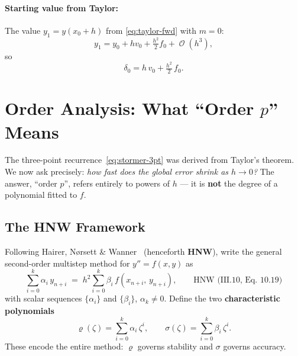 \documentclass[11pt]{article}
\DeclareMathOperator{\OO}{\mathcal{O}}
\begin{document}
\paragraph{Starting value from Taylor:}
The value $y_1 = y(x_0 + h)$ from \eqref{eq:taylor-fwd} with $m=0$:
\begin{equation}
  \label{eq:y1}
  y_1 = y_0 + h v_0 + \tfrac{h^2}{2} f_0 + \OO(h^3),
\end{equation}
so
\begin{equation}
  \label{eq:delta0}
  \boxed{\delta_0 = h\, v_0 + \tfrac{h^2}{2}\, f_0.}
\end{equation}

\section{Order Analysis: What ``Order $p$'' Means}
\label{sec:order}

The three-point recurrence~\eqref{eq:stormer-3pt} was derived from Taylor's
theorem.  We now ask precisely: \emph{how fast does the global error shrink as
$h \to 0$?}  The answer, ``order $p$'', refers entirely to powers of $h$ --- it
is \textbf{not} the degree of a polynomial fitted to $f$.

\subsection{The HNW Framework}

Following Hairer, N{\o}rsett \& Wanner~\cite{HNW} (henceforth \textbf{HNW}),
write the general second-order multistep method for $y'' = f(x,y)$ as
\begin{equation}
  \label{eq:general-multistep}
  \sum_{i=0}^{k} \alpha_i\, y_{n+i}
  \;=\; h^2 \sum_{i=0}^{k} \beta_i\, f(x_{n+i},\, y_{n+i}),
  \qquad \text{HNW (III.10, Eq.~10.19)}
\end{equation}
with scalar sequences $\{\alpha_i\}$ and $\{\beta_i\}$, $\alpha_k \neq 0$.
Define the two \textbf{characteristic polynomials}
\begin{equation}
  \label{eq:char-polys}
  \varrho(\zeta) = \sum_{i=0}^{k} \alpha_i\,\zeta^i,
  \qquad
  \sigma(\zeta) = \sum_{i=0}^{k} \beta_i\,\zeta^i.
\end{equation}
These encode the entire method: $\varrho$ governs stability and $\sigma$ governs
accuracy.
\end{document}

